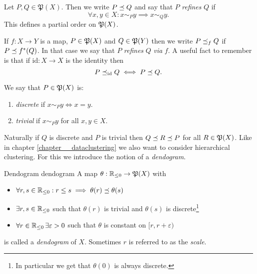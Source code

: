 \begin{definition}{}{}
Let $P, Q \in \mathfrak{P}(X)$. Then we write $P \refines Q$ and say that $P$ \emph{refines} $Q$ if
\begin{equation*}
    \forall x,y \in X: x \sim_P y \implies x \sim_Q y.
\end{equation*}
This defines a partial order on $\P(X)$.
\end{definition}
If $f: X \to Y$ is a map, $P \in \P(X)$ and $Q \in \P(Y)$ then we write $P \refines_f Q$ if $P \refines f^*(Q)$. In that case we say that $P$ \emph{refines} $Q$ \emph{via} $f$. A useful fact to remember is that if $\mathrm{id}: X \to X$ is the identity then
\begin{equation}
    \label{eq:refinement_via_identity}
    P \refines_{\mathrm{id}} Q \iff P \refines Q.
\end{equation}
\begin{definition}{}{}
We say that $P \in \P(X)$ is:
\begin{enumerate}
    \item \emph{discrete} if $x \sim_P y \iff x = y$.
    \item \emph{trivial} if $x \sim_P y$ for all $x,y \in X$.
\end{enumerate}
\end{definition}

Naturally if $Q$ is discrete and $P$ is trivial then $Q \refines R \refines P$ for all $R \in \P(X)$.
Like in chapter \ref{chapter__dataclustering} we also want to consider hierarchical clustering.
For this we introduce the notion of a \emph{dendogram}.

\begin{definition}{Dendogram \cite[Def.~2.2]{Carlsson2010}}{dendogram}
A map $\theta: \R_{\leq0} \to \mathfrak{P}(X)$ with
\begin{itemize}
    \item $\forall r,s \in \R_{\leq0}: r \leq s \implies  \theta(r) \refines \theta(s)$
    \item $\exists r,s \in \R_{\leq0}$ such that $\theta(r)$ is trivial and $\theta(s)$ is discrete\footnote{In particular we get that $\theta(0)$ is always discrete.}
    \item $\forall r \in \R_{\leq0} \,\exists \varepsilon > 0$ such that $\theta$ is constant on $[r, r + \varepsilon)$
\end{itemize}
is called a \emph{dendogram} of $X$. Sometimes $r$ is referred to as the \emph{scale}.
\end{definition}


